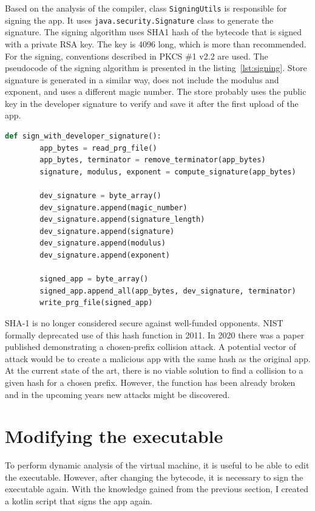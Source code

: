 Based on the analysis of the compiler, class \texttt{SigningUtils} is responsible for signing the app.
It uses \texttt{java.security.Signature} class to generate the signature.
The signing algorithm uses SHA1 hash of the bytecode that is signed with a private RSA key.
The key is 4096 long, which is more than recommended.
For the signing, conventions described in PKCS \#1 v2.2 are used\cite{java-signature,pkcs}.
The pseudocode of the signing algorithm is presented in the listing~\ref{lst:signing}.
Store signature is generated in a similar way, does not include the modulus and exponent, and uses a different magic number.
The store probably uses the public key in the developer signature to verify and save it after the first upload of the app.
\begin{lstlisting}[caption={Pseudocode of the signing algorithm, developer signature},captionpos=b,label={lst:signing},language=Python]
    def sign_with_developer_signature():
        app_bytes = read_prg_file()
        app_bytes, terminator = remove_terminator(app_bytes)
        signature, modulus, exponent = compute_signature(app_bytes)

        dev_signature = byte_array()
        dev_signature.append(magic_number)
        dev_signature.append(signature_length)
        dev_signature.append(signature)
        dev_signature.append(modulus)
        dev_signature.append(exponent)

        signed_app = byte_array()
        signed_app.append_all(app_bytes, dev_signature, terminator)
        write_prg_file(signed_app)
\end{lstlisting}

SHA-1 is no longer considered secure against well-funded opponents.
NIST formally deprecated use of this hash function in 2011.
In 2020 there was a paper published demonstrating a chosen-prefix collision attack.
A potential vector of attack would be to create a malicious app with the same hash as the original app.
At the current state of the art, there is no viable solution to find a collision to a given hash for a chosen prefix.
However, the function has been already broken and in the upcoming years new attacks might be discovered.

\section{Modifying the executable}
\label{sec:modifying-the-executable}
To perform dynamic analysis of the virtual machine, it is useful to be able to edit the executable.
However, after changing the bytecode, it is necessary to sign the executable again.
With the knowledge gained from the previous section, I created a kotlin script that signs the app again.

